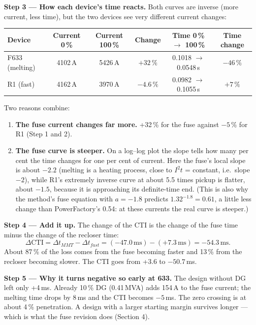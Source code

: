 \documentclass[11pt,a4paper]{article}
\begin{document}
\textbf{Step 3 --- How each device's time reacts.} Both curves are inverse (more current, less time), but the two
devices see very different current changes:

\begin{center}\small
\begin{tabular}{|l|c|c|c|c|c|}
\hline
\textbf{Device} & \textbf{Current 0\,\%} & \textbf{Current 100\,\%} & \textbf{Change} & \textbf{Time 0\,\% $\rightarrow$ 100\,\%} &
\textbf{Time change} \\ \hline
F633 (melting) & 4102\,A & 5426\,A & $+32\,\%$ & 0.1018 $\rightarrow$ 0.0548\,s & $-46\,\%$ \\ \hline
R1 (fast) & 4162\,A & 3970\,A & $-4.6\,\%$ & 0.0982 $\rightarrow$ 0.1055\,s & $+7\,\%$ \\ \hline
\end{tabular}
\end{center}

Two reasons combine:
\begin{enumerate}[leftmargin=*,itemsep=2pt]
\item \textbf{The fuse current changes far more.} +32\,\% for the fuse against $-5$\,\% for R1 (Step 1 and 2).
\item \textbf{The fuse curve is steeper.} On a log--log plot the slope tells how many per cent the time changes for
  one per cent of current. Here the fuse's local slope is about $-2.2$ (melting is a heating process, close to
  $I^2t$ = constant, i.e.\ slope $-2$), while R1's extremely inverse curve at about 5.5 times pickup is flatter,
  about $-1.5$, because it is approaching its definite-time end. (This is also why the method's fuse equation with
  $a = -1.8$ predicts $1.32^{-1.8} = 0.61$, a little less change than PowerFactory's 0.54: at these currents the real
  curve is steeper.)
\end{enumerate}

\textbf{Step 4 --- Add it up.} The change of the CTI is the change of the fuse time minus the change of the recloser
time:
\[
\Delta \mathrm{CTI} = \Delta t_{MMT} - \Delta t_{fast} = (-47.0\,\text{ms}) - (+7.3\,\text{ms}) = -54.3\,\text{ms}.
\]
About 87\,\% of the loss comes from the fuse becoming faster and 13\,\% from the recloser becoming slower. The CTI
goes from +3.6 to $-50.7$\,ms.

\textbf{Step 5 --- Why it turns negative so early at 633.} The design without DG left only +4\,ms. Already 10\,\% DG
(0.41\,MVA) adds 154\,A to the fuse current; the melting time drops by 8\,ms and the CTI becomes $-5$\,ms. The zero
crossing is at about 4\,\% penetration. A design with a larger starting margin survives longer --- which is what
the fuse revision does (Section 4).
\end{document}
